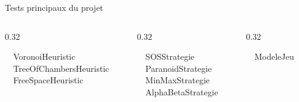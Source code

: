 \documentclass[10pt]{beamer}
\begin{document}
\begin{frame}{Tests principaux du projet}
    \begin{columns}[c]
        \begin{column}{0.32\textwidth}
            \begin{tcolorbox}[enhanced, arc=5pt, colback=softgreen, colframe=donecolor, title=\faCheckCircle Heuristiques]
                \centering
                \faCheckCircle~~VoronoiHeuristic\\
                \vspace{0.2cm}
                \faCheckCircle~~TreeOfChambersHeuristic\\
                \vspace{0.2cm}
                \faCheckCircle~~FreeSpaceHeuristic
            \end{tcolorbox}
        \end{column}
        \begin{column}{0.32\textwidth}
            \begin{tcolorbox}[enhanced, arc=5pt, colback=softblue, colframe=team2color, title=\faCheckCircle  Stratégies]
                \centering
                \faCheckCircle~~SOSStrategie\\
                \vspace{0.1cm}
                \faCheckCircle~~ParanoidStrategie\\
                \vspace{0.1cm}
                \faCheckCircle~~MinMaxStrategie\\
                \vspace{0.1cm}
                \faCheckCircle~~AlphaBetaStrategie
            \end{tcolorbox}
        \end{column}
        \begin{column}{0.32\textwidth}
            \begin{tcolorbox}[enhanced, arc=5pt, colback=softpurple, colframe=accentcolor, title=\faCheckCircle Modèle]
                \centering
                \faCheckCircle~~ModeleJeu
            \end{tcolorbox}
        \end{column}
    \end{columns}   
\end{frame}

\end{document}
